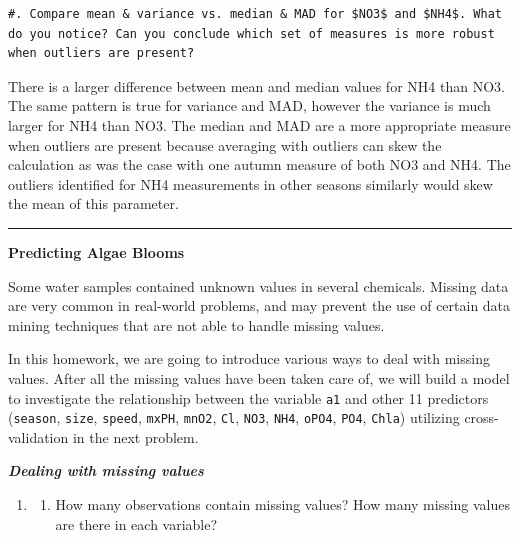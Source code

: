 \documentclass[]{article}
\providecommand{\tightlist}{%
  \setlength{\itemsep}{0pt}\setlength{\parskip}{0pt}}
\begin{document}
\begin{verbatim}
#. Compare mean & variance vs. median & MAD for $NO3$ and $NH4$. What do you notice? Can you conclude which set of measures is more robust when outliers are present? 
\end{verbatim}

There is a larger difference between mean and median values for NH4 than
NO3. The same pattern is true for variance and MAD, however the variance
is much larger for NH4 than NO3. The median and MAD are a more
appropriate measure when outliers are present because averaging with
outliers can skew the calculation as was the case with one autumn
measure of both NO3 and NH4. The outliers identified for NH4
measurements in other seasons similarly would skew the mean of this
parameter.

\begin{center}\rule{0.5\linewidth}{\linethickness}\end{center}

\textbf{Predicting Algae Blooms}

Some water samples contained unknown values in several chemicals.
Missing data are very common in real-world problems, and may prevent the
use of certain data mining techniques that are not able to handle
missing values.

In this homework, we are going to introduce various ways to deal with
missing values. After all the missing values have been taken care of, we
will build a model to investigate the relationship between the variable
\texttt{a1} and other 11 predictors (\texttt{season}, \texttt{size},
\texttt{speed}, \texttt{mxPH}, \texttt{mnO2}, \texttt{Cl}, \texttt{NO3},
\texttt{NH4}, \texttt{oPO4}, \texttt{PO4}, \texttt{Chla}) utilizing
cross-validation in the next problem.

\textbf{\emph{Dealing with missing values}}

\begin{enumerate}
\def\labelenumi{\arabic{enumi}.}
\setcounter{enumi}{2}
\item
  \begin{enumerate}
  \tightlist
  \item
    How many observations contain missing values? How many missing
    values are there in each variable?
  \end{enumerate}
\end{enumerate}
\end{document}

